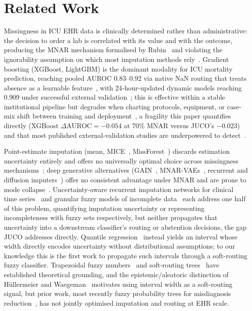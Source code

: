 \documentclass[journal]{IEEEtran}
\begin{document}
	\section{Related Work}
	\label{sec:related_work}
	\label{sec:rw_missing}
	
	Missingness in ICU EHR data is clinically determined rather than administrative: the decision to order a lab is correlated with its value and with the outcome, producing the MNAR mechanism formalised by Rubin~\cite{rubin1976inference} and violating the ignorability assumption on which most imputation methods rely~\cite{agniel2018biases}. Gradient boosting (XGBoost, LightGBM) is the dominant modality for ICU mortality prediction, reaching pooled AUROC 0.83--0.92 via native NaN routing that treats absence as a learnable feature~\cite{purushotham2018benchmarking,chen2016xgboost,mesinovic2025explainable}, with 24-hour-updated dynamic models reaching 0.909 under successful external validation~\cite{britsch2025interpretable}; this is effective within a stable institutional pipeline but degrades when charting protocols, equipment, or case-mix shift between training and deployment~\cite{josse2019consistency,sperrin2020informative}, a fragility this paper quantifies directly (XGBoost $\Delta\text{AUROC}=-0.054$ at 70\% MNAR versus JUCO's $-0.023$) and that most published external-validation studies are underpowered to detect~\cite{riley2024external}.
	
	Point-estimate imputation (mean, MICE~\cite{van2011mice}, MissForest~\cite{stekhoven2012missforest}) discards estimation uncertainty entirely and offers no universally optimal choice across missingness mechanisms~\cite{ren2024moving}; deep generative alternatives (GAIN~\cite{yoon2018gain}, MNAR-VAEs~\cite{ipsen2020not}, recurrent and diffusion imputers~\cite{ma2020mimic, zhao2024multitask}) offer no consistent advantage under MNAR and are prone to mode collapse~\cite{kazijevs2023deep}. Uncertainty-aware recurrent imputation networks for clinical time series~\cite{mulyadi2022uncertainty} and granular fuzzy models of incomplete data~\cite{hu2021granular} each address one half of this problem, quantifying imputation uncertainty or representing incompleteness with fuzzy sets respectively, but neither propagates that uncertainty into a downstream classifier's routing or abstention decisions, the gap JUCO addresses directly. Quantile regression~\cite{meinshausen2006quantile} instead yields an interval whose width directly encodes uncertainty without distributional assumptions; to our knowledge this is the first work to propagate such intervals through a soft-routing fuzzy classifier. Trapezoidal fuzzy numbers~\cite{zadeh1965fuzzy,torres2013fuzzy} and soft-routing trees~\cite{yuan1995induction} have established theoretical grounding, and the epistemic/aleatoric distinction of Hüllermeier and Waegeman~\cite{hullermeier2021aleatoric} motivates using interval width as a soft-routing signal, but prior work, most recently fuzzy probability trees for misdiagnosis reduction~\cite{capitoli2025fuzzy}, has not jointly optimised imputation and routing at EHR scale.
	
\end{document}
